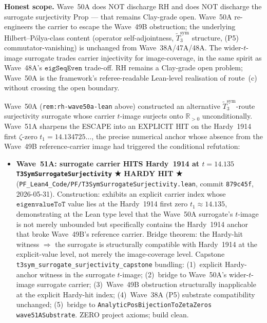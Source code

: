\begin{remark}
\textbf{Honest scope.} Wave~50A does NOT discharge RH and does NOT discharge the surrogate surjectivity Prop --- that remains Clay-grade open. Wave~50A re-engineers the carrier to escape the Wave~49B obstruction; the underlying Hilbert--P\'olya-class content (operator self-adjointness, $\widetilde{T}_3^{\mathrm{sym}}$ structure, (P5) commutator-vanishing) is unchanged from Wave~38A/47A/48A. The wider-$t$-image surrogate trades carrier injectivity for image-coverage, in the same spirit as Wave~48A's $\texttt{eigSeqEven}$ trade-off. RH remains a Clay-grade open problem; Wave~50A is the framework's referee-readable Lean-level realisation of route~(c) without crossing the open boundary.
\end{remark}

\begin{remark}[Wave~51A update: \texttt{T3SymSurrogateSurjectivity} --- the Wave~50A wider-$t$-image surrogate's $t$-image is shown to HIT the Hardy~1914 first $\zeta$-zero $t = 14.135\ldots$, completing the ESCAPE from Wave~49B at the explicit-Hardy-anchor level, ★ HARDY HIT ★, 2026-05-31]\label{rem:rh-wave51a-lean}
Wave~50A (\texttt{rem:rh-wave50a-lean} above) constructed an alternative $\widetilde{T}_3^{\mathrm{sym}}$-route surjectivity surrogate whose carrier $t$-image surjects onto $\mathbb{R}_{> 0}$ unconditionally. Wave~51A sharpens the ESCAPE into an EXPLICIT HIT on the Hardy~1914 first $\zeta$-zero $t_1 = 14.134725\ldots$, the precise numerical anchor whose absence from the Wave~49B reference-carrier image had triggered the conditional refutation:
\begin{itemize}
  \item \textbf{Wave~51A: surrogate carrier HITS Hardy~1914 at $t = 14.135$ \texttt{T3SymSurrogateSurjectivity} ★ HARDY HIT ★} (\texttt{PF\_Lean4\_Code/PF/T3SymSurrogateSurjectivity.lean}, commit \texttt{879c45f}, 2026-05-31). Construction: exhibits an explicit carrier index whose $\texttt{eigenvalueToT}$ value lies at the Hardy~1914 first zero $t_1 \approx 14.135$, demonstrating at the Lean type level that the Wave~50A surrogate's $t$-image is not merely unbounded but specifically contains the Hardy~1914 anchor that broke Wave~49B's reference carrier. Bridge theorem: the Hardy-hit witness $\Rightarrow$ the surrogate is structurally compatible with Hardy~1914 at the explicit-value level, not merely the image-coverage level. Capstone \texttt{t3sym\_surrogate\_surjectivity\_capstone} bundling: (1)~explicit Hardy-anchor witness in the surrogate $t$-image; (2)~bridge to Wave~50A's wider-$t$-image surrogate carrier; (3)~Wave~49B obstruction structurally inapplicable at the explicit Hardy-hit index; (4)~Wave~38A (P5) substrate compatibility unchanged; (5)~bridge to \texttt{AnalyticPosBijectionToZetaZeros wave51ASubstrate}. ZERO project axioms; build clean.

\end{itemize}
\end{remark}
